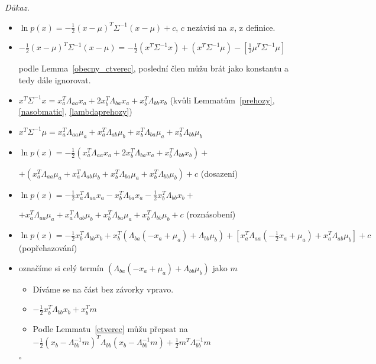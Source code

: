 \documentclass{article}
\newenvironment{pitemize}{
\begin{itemize}
  \setlength{\itemsep}{5pt}
  \setlength{\parskip}{0pt}
  \setlength{\parsep}{0pt}
}{\end{itemize}}
\newenvironment{pproof}{
\noindent\emph{Důkaz.}
\begin{pitemize}
}{\hfill$\square$\end{pitemize}}
\theoremstyle{definition}
\begin{document}
\begin{pproof}


\item $\ln p(x) = -\frac{1}{2}(x-\mu)^T\Sigma^{-1}(x-\mu) + c$, $c$ nezávisí na $x$, z definice.
\item $-\frac{1}{2}(x-\mu)^T\Sigma^{-1}(x-\mu) = -\frac{1}{2}\left(x^T\Sigma^{-1}x\right)+\left(x^T\Sigma^{-1}\mu\right) - \left[\frac{1}{2}\mu^T \Sigma^{-1}\mu\right]$ 

podle Lemma~\ref{obecny_ctverec}, poslední člen můžu brát jako konstantu a tedy dále ignorovat.


\item $x^T\Sigma^{-1}x=x_a^T\Lambda_{aa}x_a+2x_b^T\Lambda_{ba}x_a+x_b^T\Lambda_{bb}x_b$ (kvůli Lemmatům~\ref{prehozy}, \ref{nasobmatic}, \ref{lambdaprehozy})

\item $x^T\Sigma^{-1}\mu=x_a^T\Lambda_{aa}\mu_a+x_a^T\Lambda_{ab}\mu_b+x_b^T\Lambda_{ba}\mu_a+x_b^T\Lambda_{bb}\mu_b$

\item $\ln p(x)=-\frac{1}{2}\left(x_a^T\Lambda_{aa}x_a
+2x_b^T\Lambda_{ba}x_a
+x_b^T\Lambda_{bb}x_b\right)+$

$+
\left(x_a^T
\Lambda_{aa}\mu_a+x_a^T\Lambda_{ab}
\mu_b+x_b^T\Lambda_{ba}\mu_a+x_b^T
\Lambda_{bb}\mu_b\right) +c$ (dosazení)

\item $\ln p(x)=-\frac{1}{2}x_a^T\Lambda_{aa}x_a
-x_b^T\Lambda_{ba}x_a
-\frac{1}{2}x_b^T\Lambda_{bb}x_b+$

$+
x_a^T
\Lambda_{aa}\mu_a+x_a^T\Lambda_{ab}
\mu_b+x_b^T\Lambda_{ba}\mu_a+x_b^T
\Lambda_{bb}\mu_b+c$ (roznásobení)

\item $\ln p(x)=-\frac{1}{2}x_b^T\Lambda_{bb}x_b+x_b^T\left(\Lambda_{ba}\left(-x_a+\mu_a\right)+\Lambda_{bb}\mu_b\right)+
\left[x_a^T\Lambda_{aa}\left(-\frac{1}{2}x_a+\mu_a\right)+x_a^T\Lambda_{ab}\mu_b\right]+c$ (popřehazování)

\item označíme si celý termín $\left(\Lambda_{ba}\left(-x_a+\mu_a\right)+\Lambda_{bb}\mu_b\right)$ jako $m$

\begin{itemize}
\item Díváme se na část bez závorky vpravo. 
\item $-\frac{1}{2}x_b^T\Lambda_{bb}x_b+x_b^Tm$
\item Podle Lemmatu~\ref{ctverec} můžu přepsat na $-\frac{1}{2}\left(x_b-\Lambda_{bb}^{-1}m\right)^T
\Lambda_{bb}\left(x_b-\Lambda_{bb}^{-1}m
\right)+\frac{1}{2}m^T\Lambda_{bb}^{-1} m$
\end{itemize}


\end{pproof}
\end{document}
